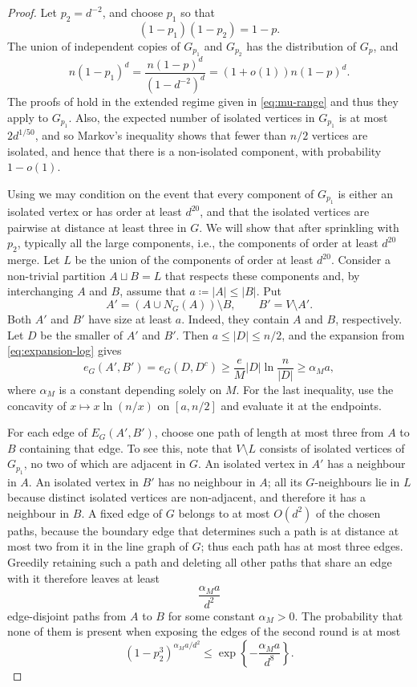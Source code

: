 \documentclass[10pt,a4paper]{amsart}
\begin{document}
\begin{proof}
Let $p_2=d^{-2}$, and choose $p_1$ so that
\[
  (1-p_1)(1-p_2)=1-p.
\]
The union of independent copies of $G_{p_1}$ and $G_{p_2}$ has the distribution of $G_p$, and
\[
  n(1-p_1)^d=\frac{n(1-p)^d}{(1-d^{-2})^d}=(1+o(1))n (1-p)^d.
\]
The proofs of  hold in the extended regime given in \eqref{eq:mu-range} and thus they apply to $G_{p_1}$.
Also, the expected number of isolated vertices in $G_{p_1}$ is at most $2d^{1/50}$, and so Markov's inequality shows that fewer than $n/2$ vertices are isolated, and hence that there is a non-isolated component, with probability $1-o(1)$.

Using  we may condition on the event that every component of $G_{p_1}$ is either an isolated vertex or has order at least $d^{20}$, and that the isolated vertices are pairwise at distance at least three in $G$. We will show that after sprinkling with $p_2$, typically all the large components, i.e., the components of order at least $d^{20}$ merge.
Let $L$ be the union of the components of order at least $d^{20}$.
Consider a non-trivial partition $A\sqcup B=L$ that respects these components and, by interchanging $A$ and $B$, assume that $a\coloneqq |A|\le|B|$.
Put
\[
  A'=(A\cup N_G(A))\setminus B,
  \qquad B'=V\setminus A'.
\]
Both $A'$ and $B'$ have size at least $a$.
Indeed, they contain $A$ and $B$, respectively.
Let $D$ be the smaller of $A'$ and $B'$.
Then $a\le|D|\le n/2$, and the expansion from \eqref{eq:expansion-log} gives
\[
  e_G(A',B')=e_G(D,D^c)
  \ge \frac{e}{M}|D|\ln\frac{n}{|D|}
  \ge \alpha_Ma,
\]
where $\alpha_M$ is a constant depending solely on $M$.
For the last inequality, use the concavity of $x\mapsto x\ln(n/x)$ on $[a,n/2]$ and evaluate it at the endpoints.

For each edge of $E_G(A',B')$, choose one path of length at most three from $A$ to $B$ containing that edge.
To see this, note that $V\setminus L$ consists of isolated vertices of $G_{p_1}$, no two of which are adjacent in $G$.
An isolated vertex in $A'$ has a neighbour in $A$.
An isolated vertex in $B'$ has no neighbour in $A$; all its $G$-neighbours lie in $L$ because distinct isolated vertices are non-adjacent, and therefore it has a neighbour in $B$.
A fixed edge of $G$ belongs to at most $O(d^2)$ of the chosen paths, because the boundary edge that determines such a path is at distance at most two from it in the line graph of $G$; thus each path has at most three edges.
Greedily retaining such a path and deleting all other paths that share an edge with it therefore leaves at least
\[
  \frac{\alpha_M a}{d^2}
\]
edge-disjoint paths from $A$ to $B$ for some constant $\alpha_M>0$.
The probability that none of them is present when exposing the edges of the second round is at most
\[
  (1-p_2^3)^{\alpha_Ma/d^2}\le \exp\left\{-\frac{\alpha_Ma}{d^8}\right\}.
\]


\end{proof}
\end{document}
